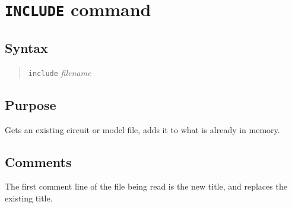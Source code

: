 %
%
%
%
\section{{\tt INCLUDE} command}
\subsection{Syntax}
\begin{verse}
{\tt include} {\it filename}
\end{verse}
\subsection{Purpose}

Gets an existing circuit or model file, adds it to what is already in memory.
\subsection{Comments}

The first comment line of the file being read is the new title, and replaces
the existing title.

